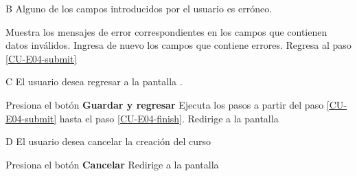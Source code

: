\begin{UCtrayectoriaA}{B}{%
Alguno de los campos introducidos por el usuario es erróneo.
}

  \Sistema Muestra los mensajes de error correspondientes en los campos que
           contienen datos inválidos.
  \Actor Ingresa de nuevo los campos que contiene errores.
  \Sistema Regresa al paso \ref{CU-E04-submit}

\end{UCtrayectoriaA}

\begin{UCtrayectoriaA}{C}{%
El usuario desea regresar a la pantalla .
}

  \Actor Presiona el botón {\bf Guardar y regresar}
  \Sistema Ejecuta los pasos a partir del paso \ref{CU-E04-submit} hasta el
           paso \ref{CU-E04-finish}.
  \Sistema Redirige a la pantalla 

\end{UCtrayectoriaA}

\begin{UCtrayectoriaA}{D}{%
El usuario desea cancelar la creación del curso
}

  \Actor Presiona el botón {\bf Cancelar}
  \Sistema Redirige a la pantalla 

\end{UCtrayectoriaA}
